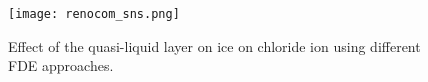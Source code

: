 \documentclass[a4paper,11pt]{report}
\begin{document}
\begin{figure}[H]\large
\texttt{[image: renocom\_sns.png]}
\caption{Effect of the quasi-liquid layer on ice on chloride ion using different FDE approaches.}
\label{figure45}
\end{figure}



\end{document}
